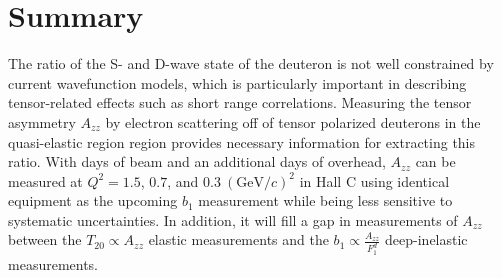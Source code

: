 \section{Summary}

The ratio of the S- and D-wave state of the deuteron is not well constrained by current wavefunction models, which is particularly important in describing tensor-related effects such as short range correlations. Measuring the tensor asymmetry $A_{zz}$ by electron scattering off of tensor polarized deuterons in the quasi-elastic region region provides necessary information for extracting this ratio. With \productiondays days of beam and an additional \overheaddays days of overhead, $A_{zz}$ can be measured at $Q^2=1.5$, $0.7$, and $0.3~(\mathrm{GeV}/c)^2$ in Hall C using identical equipment as the upcoming $b_1$ measurement while being less sensitive to systematic uncertainties. In addition, it will fill a gap in measurements of $A_{zz}$ between the $T_{20}\propto A_{zz}$ elastic measurements and the $b_1\propto \frac{A_{zz}}{F_1^d}$ deep-inelastic measurements. 